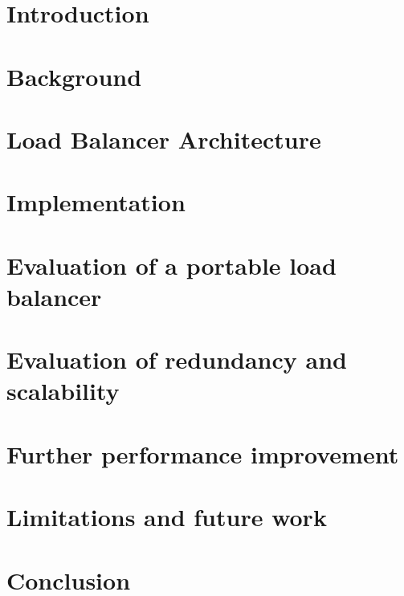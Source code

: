 
\graphicspath{{Manuscript/}}

\chapter{Introduction}\label{chapter:introduction}


\chapter{Background}\label{chapter:background}



\chapter{Load Balancer Architecture}\label{chapter:architecture}


\chapter{Implementation}\label{chapter:implemetation}


\chapter{Evaluation of a portable load balancer}\label{chapter:portablelb}


\chapter{Evaluation of redundancy and scalability}\label{chapter:redundancy}


\chapter{Further performance improvement}\label{chapter:performance}


\chapter{Limitations and future work}\label{chapter:futurework}


\chapter{Conclusion}\label{chapter:conclusion}




